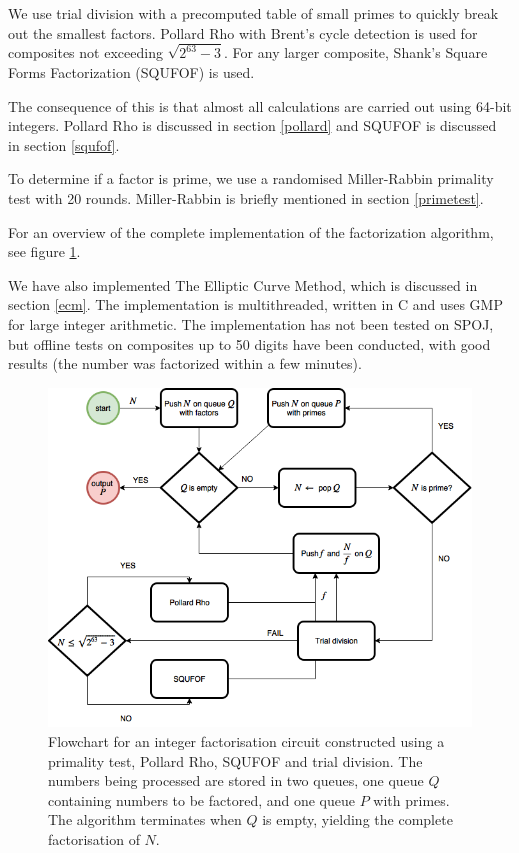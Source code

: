 \documentclass{article}
\begin{document}
We use trial division with a precomputed table of small primes to quickly break out the smallest factors. Pollard Rho with Brent's cycle detection is used for composites not exceeding $\sqrt{2^{63}-3}$. For any larger composite, Shank's Square Forms Factorization (SQUFOF) is used. 

The consequence of this is that almost all calculations are carried out using 64-bit integers. Pollard Rho is discussed in section \ref{pollard} and SQUFOF is discussed in section \ref{squfof}.

To determine if a factor is prime, we use a randomised Miller-Rabbin primality test with 20 rounds. Miller-Rabbin is briefly mentioned in section \ref{primetest}. 

For an overview of the complete implementation of the factorization algorithm, see figure \ref{fig:flowchart}.

We have also implemented The Elliptic Curve Method, which is discussed in section \ref{ecm}. The implementation is multithreaded, written in C and uses GMP for large integer arithmetic. The implementation has not been tested on SPOJ, but offline tests on composites up to 50 digits have been conducted, with good results (the number was factorized within a few minutes). 

\begin{figure}[p!]
\centering
\includegraphics[width=\textwidth]{flowchart}
\caption{Flowchart for an integer factorisation circuit constructed using a primality test, Pollard Rho, SQUFOF and trial division. The numbers being processed are stored in two queues, one queue $Q$ containing numbers to be factored, and one queue $P$ with primes. The algorithm terminates when $Q$ is empty, yielding the complete factorisation of $N$.}
\label{fig:flowchart}
\end{figure}
\end{document}
